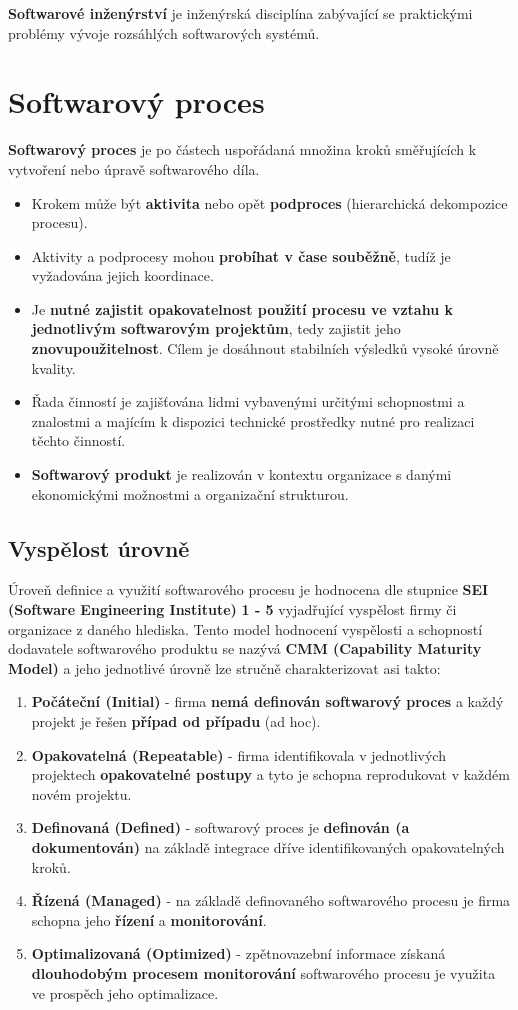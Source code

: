 \textbf{Softwarové inženýrství} je inženýrská disciplína zabývající se praktickými problémy vývoje
rozsáhlých softwarových systémů.

\section*{Softwarový proces}
\textbf{Softwarový proces} je po částech uspořádaná množina kroků směřujících k vytvoření nebo úpravě softwarového díla.
\begin{itemize}
\item Krokem může být \textbf{aktivita} nebo opět \textbf{podproces} (hierarchická dekompozice procesu). 
\item Aktivity a podprocesy mohou \textbf{probíhat v čase souběžně}, tudíž je vyžadována jejich koordinace. 
\item Je \textbf{nutné zajistit opakovatelnost použití procesu ve vztahu k jednotlivým softwarovým projektům}, tedy zajistit jeho \textbf{znovupoužitelnost}.  Cílem je dosáhnout stabilních výsledků vysoké úrovně kvality.
\item Řada činností je zajišťována lidmi vybavenými určitými schopnostmi a znalostmi a majícím k dispozici technické prostředky nutné pro realizaci těchto činností.
\item \textbf{Softwarový produkt} je realizován v kontextu organizace s danými ekonomickými možnostmi a organizační strukturou.
\end{itemize}

\subsection{Vyspělost úrovně}
Úroveň definice a využití softwarového procesu je hodnocena dle stupnice \textbf{SEI (Software Engineering Institute)} \textbf{1 - 5} vyjadřující vyspělost firmy či organizace z daného hlediska. Tento model hodnocení vyspělosti a schopností dodavatele softwarového produktu se nazývá \textbf{CMM (Capability Maturity Model)} a jeho jednotlivé úrovně lze stručně charakterizovat asi takto:

\begin{enumerate}
\item \textbf{Počáteční (Initial)} - firma \textbf{nemá definován softwarový proces} a každý projekt je řešen \textbf{případ od případu} (ad hoc).
\item \textbf{Opakovatelná (Repeatable)} - firma identifikovala v jednotlivých projektech \textbf{opakovatelné postupy} a tyto je schopna reprodukovat v každém novém projektu.
\item \textbf{Definovaná (Defined)} - softwarový proces je \textbf{definován (a dokumentován)} na základě integrace dříve identifikovaných opakovatelných kroků.
\item \textbf{Řízená (Managed)} - na základě definovaného softwarového procesu je firma schopna jeho \textbf{řízení} a \textbf{monitorování}.
\item \textbf{Optimalizovaná (Optimized)} - zpětnovazební informace získaná \textbf{dlouhodobým procesem monitorování} softwarového procesu je využita ve prospěch jeho optimalizace.
\end{enumerate}

